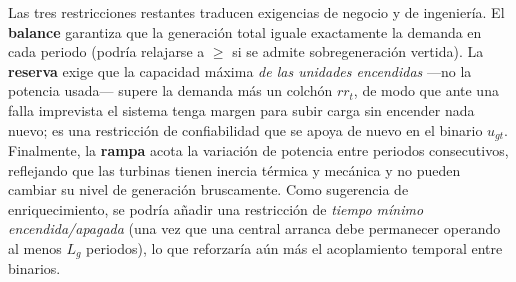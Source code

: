 \documentclass[11pt]{article}
\begin{document}
Las tres restricciones restantes traducen exigencias de negocio y de ingeniería. El \textbf{balance} garantiza que la generación total iguale exactamente la demanda en cada periodo (podría relajarse a $\ge$ si se admite sobregeneración vertida). La \textbf{reserva} exige que la capacidad máxima \emph{de las unidades encendidas} —no la potencia usada— supere la demanda más un colchón $\mathit{rr}_t$, de modo que ante una falla imprevista el sistema tenga margen para subir carga sin encender nada nuevo; es una restricción de confiabilidad que se apoya de nuevo en el binario $u_{gt}$. Finalmente, la \textbf{rampa} acota la variación de potencia entre periodos consecutivos, reflejando que las turbinas tienen inercia térmica y mecánica y no pueden cambiar su nivel de generación bruscamente. Como sugerencia de enriquecimiento, se podría añadir una restricción de \emph{tiempo mínimo encendida/apagada} (una vez que una central arranca debe permanecer operando al menos $L_g$ periodos), lo que reforzaría aún más el acoplamiento temporal entre binarios.

\fi
\end{document}

